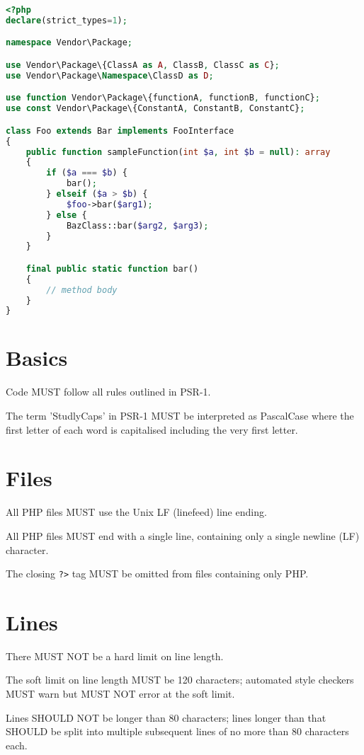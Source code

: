 \begin{lstlisting}[language=PHP]
<?php
declare(strict_types=1);

namespace Vendor\Package;

use Vendor\Package\{ClassA as A, ClassB, ClassC as C};
use Vendor\Package\Namespace\ClassD as D;

use function Vendor\Package\{functionA, functionB, functionC};
use const Vendor\Package\{ConstantA, ConstantB, ConstantC};

class Foo extends Bar implements FooInterface
{
    public function sampleFunction(int $a, int $b = null): array
    {
        if ($a === $b) {
            bar();
        } elseif ($a > $b) {
            $foo->bar($arg1);
        } else {
            BazClass::bar($arg2, $arg3);
        }
    }

    final public static function bar()
    {
        // method body
    }
}
\end{lstlisting}


\section{Basics}


Code MUST follow all rules outlined in PSR-1.

The term 'StudlyCaps' in PSR-1 MUST be interpreted as PascalCase where the first letter of each word is capitalised including the very first letter.


\section{Files}

All PHP files MUST use the Unix LF (linefeed) line ending.

All PHP files MUST end with a single line, containing only a single newline (LF) character.

The closing \texttt{?>} tag MUST be omitted from files containing only PHP.

\section{Lines}


There MUST NOT be a hard limit on line length.

The soft limit on line length MUST be 120 characters; automated style checkers MUST warn but MUST NOT error at the soft limit.

Lines SHOULD NOT be longer than 80 characters; lines longer than that SHOULD be split into multiple subsequent lines of no more than 80 characters each.


